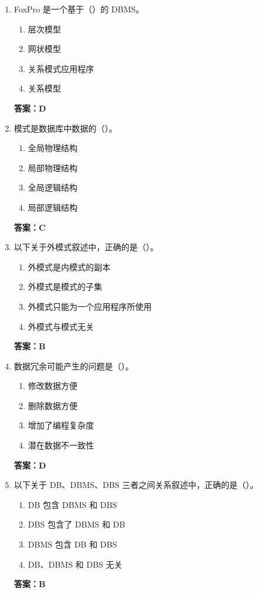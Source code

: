 \documentclass[12pt, a4paper]{article}
\begin{document}
\begin{enumerate}[label=\arabic*.]
	\item FoxPro 是一个基于（\quad）的 DBMS。
	      \begin{enumerate}
		      \item 层次模型
		      \item 网状模型
		      \item 关系模式应用程序
		      \item 关系模型
	      \end{enumerate}
	      \textbf{答案：D}

	\item 模式是数据库中数据的（\quad）。
	      \begin{enumerate}
		      \item 全局物理结构
		      \item 局部物理结构
		      \item 全局逻辑结构
		      \item 局部逻辑结构
	      \end{enumerate}
	      \textbf{答案：C}

	\item 以下关于外模式叙述中，正确的是（\quad）。
	      \begin{enumerate}
		      \item 外模式是内模式的副本
		      \item 外模式是模式的子集
		      \item 外模式只能为一个应用程序所使用
		      \item 外模式与模式无关
	      \end{enumerate}
	      \textbf{答案：B}

	\item 数据冗余可能产生的问题是（\quad）。
	      \begin{enumerate}
		      \item 修改数据方便
		      \item 删除数据方便
		      \item 增加了编程复杂度
		      \item 潜在数据不一致性
	      \end{enumerate}
	      \textbf{答案：D}

	\item 以下关于 DB、DBMS、DBS 三者之间关系叙述中，正确的是（\quad）。
	      \begin{enumerate}
		      \item DB 包含 DBMS 和 DBS
		      \item DBS 包含了 DBMS 和 DB
		      \item DBMS 包含 DB 和 DBS
		      \item DB、DBMS 和 DBS 无关
	      \end{enumerate}
	      \textbf{答案：B}


\end{enumerate}
\end{document}
